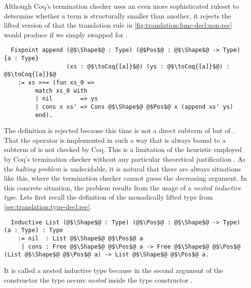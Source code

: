 Although Coq's termination checker uses an even more sophisticated ruleset to determine whether a term is structurally smaller than another, it rejects the lifted version of  that the translation rule in \autoref{fig:translation:func-decl:non-rec} would produce if we simply swapped  for .
\begin{verbatim}
  Fixpoint append (@$\Shape$@ : Type) (@$Pos$@ : @$\Shape$@ -> Type) {a : Type}
                  (xs : @$\toCoq{[a]}$@) (ys : @$\toCoq{[a]}$@) : @$\toCoq{[a]}$@
    := xs >>= (fun xs_0 =>
         match xs_0 with
         | nil        => ys
         | cons x xs' => Cons @$\Shape$@ @$Pos$@ x (append xs' ys)
         end).
\end{verbatim}
The definition is rejected because this time  is not a direct subterm of  but of .
That the \coq{>>=} operator is implemented in such a way that  is always bound to a subterm of  is not checked by Coq.
This is a limitation of the heuristic employed by Coq's termination checker without any particular theoretical justification \cite[p.~62]{Chlipala:2013}.
As the \textit{halting problem} is undecidable, it is natural that there are always situations like this, where the termination checker cannot guess the decreasing argument.
In this concrete situation, the problem results from the usage of a \textit{nested inductive type}.
Lets first recall the definition of the monadically lifted  type from \autoref{sec:translation:type-decl:rec}.
\begin{verbatim}
  Inductive List (@$\Shape$@ : Type) (@$\Pos$@ : @$\Shape$@ -> Type) (a : Type) : Type
    := nil  : List @$\Shape$@ @$\Pos$@ a
     | cons : Free @$\Shape$@ @$\Pos$@ a -> Free @$\Shape$@ @$\Pos$@ (List @$\Shape$@ @$\Pos$@ a) -> List @$\Shape$@ @$\Pos$@ a.
\end{verbatim}
It is called a nested inductive type because in the second argument of the  constructor the type  occurs \textit{nested} inside the type constructor  \cite[p.~29]{Dylus:2018}.

